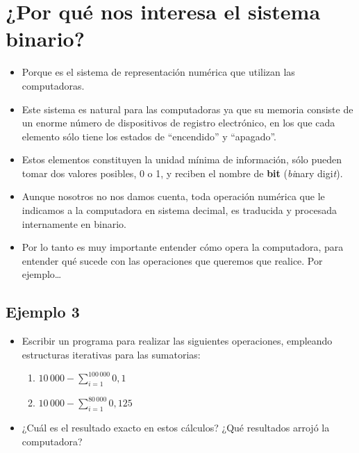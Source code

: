 \documentclass[]{book}
\providecommand{\tightlist}{%
  \setlength{\itemsep}{0pt}\setlength{\parskip}{0pt}}
\begin{document}
\hypertarget{por-quuxe9-nos-interesa-el-sistema-binario}{%
\section{¿Por qué nos interesa el sistema binario?}\label{por-quuxe9-nos-interesa-el-sistema-binario}}

\begin{itemize}
\tightlist
\item
  Porque es el sistema de representación numérica que utilizan las computadoras.
\item
  Este sistema es natural para las computadoras ya que su memoria consiste de un enorme número de dispositivos de registro electrónico, en los que cada elemento sólo tiene los estados de ``encendido'' y ``apagado''.
\item
  Estos elementos constituyen la unidad mínima de información, sólo pueden tomar dos valores posibles, 0 o 1, y reciben el nombre de \textbf{bit} (\emph{bi}nary digi\emph{t}).
\item
  Aunque nosotros no nos damos cuenta, toda operación numérica que le indicamos a la computadora en sistema decimal, es traducida y procesada internamente en binario.
\item
  Por lo tanto es muy importante entender cómo opera la computadora, para entender qué sucede con las operaciones que queremos que realice. Por ejemplo\ldots{}
\end{itemize}

\hypertarget{ejemplo-3}{%
\subsection{Ejemplo 3}\label{ejemplo-3}}

\begin{itemize}
\item
  Escribir un programa para realizar las siguientes operaciones, empleando estructuras iterativas para las sumatorias:

  \begin{enumerate}
  \def\labelenumi{\alph{enumi})}
  \tightlist
  \item
    \(10 \, 000 - \sum_{i=1}^{100 \, 000} 0,1\)
  \item
    \(10 \, 000 - \sum_{i=1}^{80 \, 000} 0,125\)
  \end{enumerate}
\item
  ¿Cuál es el resultado exacto en estos cálculos? ¿Qué resultados arrojó la computadora?
\end{itemize}
\end{document}
